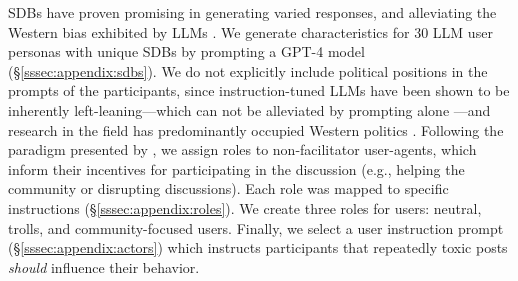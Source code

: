 \acfp{SDB} have proven promising in generating varied responses, and alleviating the Western bias exhibited by \acp{LLM} \cite{burton2024large}. We generate characteristics for 30 \ac{LLM} user personas with unique \acp{SDB} by prompting a GPT-4 model \cite{openai2024gpt4technicalreport} (\S\ref{sssec:appendix:sdbs}). We do not explicitly include political positions in the prompts of the participants, since instruction-tuned \acp{LLM} have been shown to be inherently left-leaning---which can not be alleviated by prompting alone \cite{Taubenfeld2024SystematicBI}---and research in the field has predominantly occupied Western politics \cite{Taubenfeld2024SystematicBI, potter-etal-2024-hidden, political_2024, pit2024oninvestigatingpoliticalstance}. Following the paradigm presented by \citet{abdelnabi_negotiations}, we assign roles to non-facilitator user-agents, which inform their incentives for participating in the discussion (e.g., helping the community or disrupting discussions). Each role was mapped to specific instructions (\S\ref{sssec:appendix:roles}). We create three roles for users: neutral, trolls, and community-focused users.  Finally, we select a user instruction prompt (\S\ref{sssec:appendix:actors}) which instructs participants that repeatedly toxic posts \emph{should} influence their behavior. 